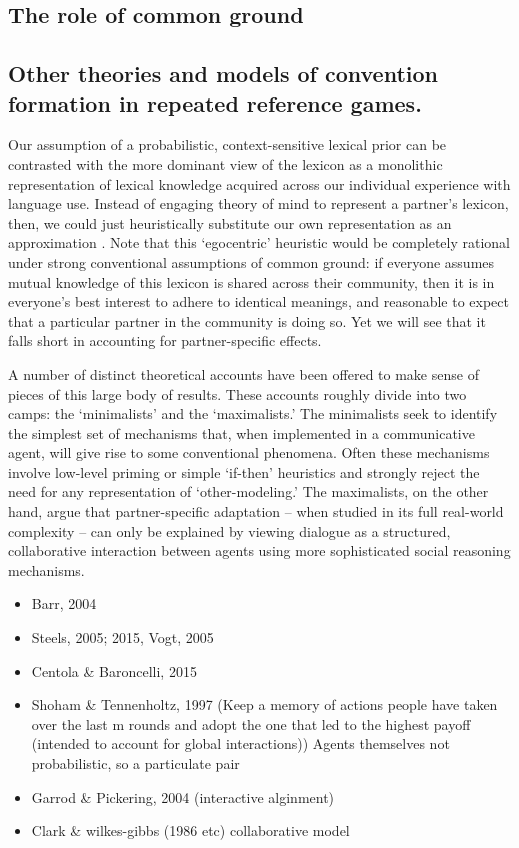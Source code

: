 \documentclass[11pt, floatsintext, jou]{apa6}
\begin{document}
\subsection{The role of common ground}


\subsection{Other theories and models of convention formation in repeated reference games.}

Our assumption of a probabilistic, context-sensitive lexical prior can be contrasted with the more dominant view of the lexicon as a monolithic representation of lexical knowledge acquired across our individual experience with language use. Instead of engaging theory of mind to represent a partner's lexicon, then, we could just heuristically substitute our own representation as an approximation   \cite{Steels03_GroundedCommunication,JonesEtAl15_SemanticMemory}. %
Note that this `egocentric' heuristic would be completely rational under strong conventional assumptions of common ground: if everyone assumes mutual knowledge of this lexicon is shared across their community, then it is in everyone's best interest to adhere to identical meanings, and reasonable to expect that a particular partner in the community is doing so. Yet we will see that it falls short in accounting for partner-specific effects.

A number of distinct theoretical accounts have been offered to make sense of pieces of this large body of results. These accounts roughly divide into two camps: the `minimalists' and the `maximalists.' The minimalists seek to identify the simplest set of mechanisms that, when implemented in a communicative agent, will give rise to some conventional phenomena. Often these mechanisms involve low-level priming or simple `if-then' heuristics and strongly reject the need for any representation of `other-modeling.' The maximalists, on the other hand, argue that partner-specific adaptation -- when studied in its full real-world complexity -- can only be explained by viewing dialogue as a structured, collaborative interaction between agents using more sophisticated social reasoning mechanisms. 

\begin{itemize}
\item Barr, 2004
\item Steels, 2005; 2015, Vogt, 2005
\item Centola \& Baroncelli, 2015
\item Shoham \& Tennenholtz, 1997 (Keep a memory of actions people have taken over the last m rounds and adopt the one that led to the highest payoff (intended to account for global interactions))
Agents themselves not probabilistic, so a particulate pair 
\item Garrod \& Pickering, 2004 (interactive alginment) 
\item Clark \& wilkes-gibbs (1986 etc) collaborative model
\end{itemize}
\end{document}
